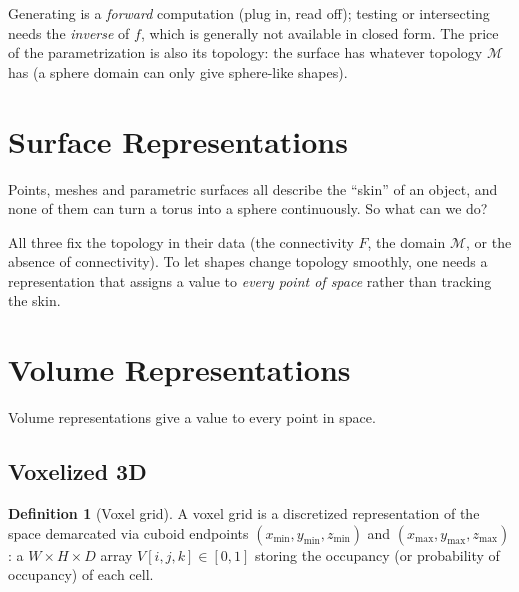 \documentclass[11pt,a4paper]{article}
\newcommand{\M}{\mathcal{M}}
\theoremstyle{definition}
\newtheorem{definition}{Definition}[section]
\theoremstyle{plain}
\theoremstyle{remark}
\begin{document}
\begin{intuition}
Generating is a \emph{forward} computation (plug in, read off); testing or intersecting needs the \emph{inverse} of $f$, which is generally not available in closed form. The price of the parametrization is also its topology: the surface has whatever topology $\M$ has (a sphere domain can only give sphere-like shapes).
\end{intuition}

\section{Surface Representations }

Points, meshes and parametric surfaces all describe the ``skin'' of an object, and none of them can turn a torus into a sphere continuously. So what can we do?

\begin{intuition}
All three fix the topology in their data (the connectivity $F$, the domain $\M$, or the absence of connectivity). To let shapes change topology smoothly, one needs a representation that assigns a value to \emph{every point of space} rather than tracking the skin.
\end{intuition}

\section{Volume Representations }

Volume representations give a value to every point in space.

\subsection{Voxelized 3D }
\begin{definition}[Voxel grid]
A voxel grid is a discretized representation of the space demarcated via cuboid endpoints $(x_{\min},y_{\min},z_{\min})$ and $(x_{\max},y_{\max},z_{\max})$: a $W\times H\times D$ array $V[i,j,k]\in[0,1]$ storing the occupancy (or probability of occupancy) of each cell.
\end{definition}
\end{document}
